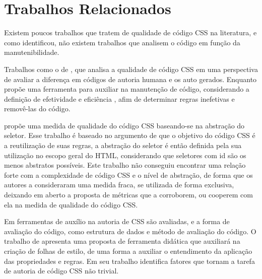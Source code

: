 %
%

\chapter{Trabalhos Relacionados}

Existem poucos trabalhos que tratem de qualidade de código CSS na literatura, e como  identificou, não existem trabalhos que analisem o código em função da manutenibilidade.

Trabalhos como o de , que analisa a qualidade de código CSS em uma perspectiva de avaliar a diferença em códigos de autoria humana e os auto gerados. Enquanto  propõe uma ferramenta para auxiliar na manutenção de código, considerando a definição de efetividade e eficiência \cite{KellerNuss2010}, afim de determinar regras inefetivas e removê-las do código.

 propõe uma medida de qualidade do código CSS baseando-se na abstração do seletor. Esse trabalho é baseado no argumento de que o objetivo do código CSS é a reutilização de suas regras, a abstração do seletor é então definida pela sua utilização no escopo geral do HTML, considerando que seletores com id são os menos abstratos possíveis. Este trabalho não conseguiu encontrar uma relação forte com a complexidade de código CSS e o nível de abstração, de forma que os autores a consideraram uma medida fraca, se utilizada de forma exclusiva, deixando em aberto a proposta de métricas que a corroborem, ou cooperem com ela na medida de qualidade do código CSS.

Em  ferramentas de auxílio na autoria de CSS são avaliadas, e a forma de avaliação do código, como estrutura de dados e método de avaliação do código. O trabalho de  apresenta uma proposta de ferramenta didática que auxiliará na criação de folhas de estilo, de uma forma a auxiliar o entendimento da aplicação das propriedades e regras. Em seu trabalho  identifica fatores que tornam a tarefa de autoria de código CSS não trivial.

